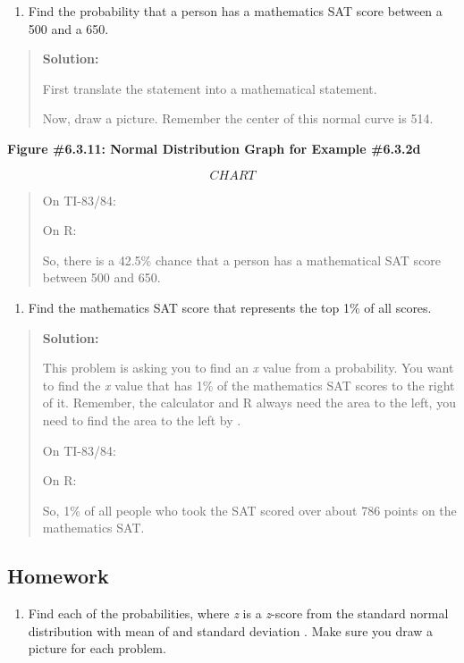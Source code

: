 \documentclass[]{book}
\providecommand{\tightlist}{%
  \setlength{\itemsep}{0pt}\setlength{\parskip}{0pt}}
\begin{document}
\begin{enumerate}
\def\labelenumi{\alph{enumi}.}
\setcounter{enumi}{3}
\tightlist
\item
  Find the probability that a person has a mathematics SAT score
  between a 500 and a 650.
\end{enumerate}

\begin{quote}
\textbf{Solution:}

First translate the statement into a mathematical statement.

Now, draw a picture. Remember the center of this normal curve is 514.
\end{quote}

\textbf{Figure \#6.3.11: Normal Distribution Graph for Example \#6.3.2d}

{\[CHART\]}

\begin{quote}
On TI-83/84:

On R:

So, there is a 42.5\% chance that a person has a mathematical SAT score
between 500 and 650.
\end{quote}

\begin{enumerate}
\def\labelenumi{\alph{enumi}.}
\setcounter{enumi}{4}
\tightlist
\item
  Find the mathematics SAT score that represents the top 1\% of all
  scores.
\end{enumerate}

\begin{quote}
\textbf{Solution:}

This problem is asking you to find an \emph{x} value from a probability.
You want to find the \emph{x} value that has 1\% of the mathematics SAT
scores to the right of it. Remember, the calculator and R always need
the area to the left, you need to find the area to the left by .

On TI-83/84:

On R:

So, 1\% of all people who took the SAT scored over about 786 points on
the mathematics SAT.
\end{quote}

\hypertarget{homework-17}{%
\subsection{Homework}\label{homework-17}}

\begin{enumerate}
\def\labelenumi{\arabic{enumi}.}
\tightlist
\item
  Find each of the probabilities, where \emph{z} is a \emph{z}-score from the standard normal distribution with mean of and standard deviation . Make sure you draw a picture for each problem.
\end{enumerate}
\end{document}
